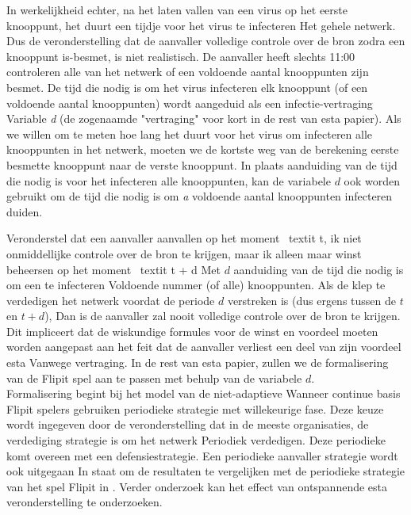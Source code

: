 \documentclass[master=cws, masteroption=vs]{kulemt}
\begin{document}
\begin{abstract*}
In werkelijkheid echter, na het laten vallen van een virus op het eerste knooppunt, het duurt een tijdje voor het virus te infecteren
Het gehele netwerk. Dus de veronderstelling dat de aanvaller volledige controle over de bron zodra een knooppunt is-besmet, is niet realistisch. De aanvaller heeft slechts 11:00 controleren alle van het netwerk of een voldoende aantal knooppunten zijn besmet.
De tijd die nodig is om het virus infecteren elk knooppunt (of een voldoende aantal knooppunten) wordt
aangeduid als een infectie-vertraging Variable \textit{d} (de zogenaamde "vertraging" voor kort in de rest van esta papier). Als we willen om te meten hoe lang het duurt voor het virus om
infecteren alle knooppunten in het netwerk, moeten we de kortste weg van de berekening
eerste besmette knooppunt naar de verste knooppunt. In plaats aanduiding van de tijd die nodig is voor het infecteren alle knooppunten, kan de variabele $ d $ ook worden gebruikt om de tijd die nodig is om \textit{a} voldoende aantal knooppunten infecteren duiden.

Veronderstel dat een aanvaller aanvallen op het moment \ textit {t}, ik niet onmiddellijke controle over de bron te krijgen, maar ik alleen maar winst beheersen op het moment \ textit {t + d} Met $ d $ aanduiding van de tijd die nodig is om een te infecteren Voldoende nummer (of alle) knooppunten. Als de klep te verdedigen het netwerk voordat de periode $ d $ verstreken is (dus ergens tussen de $ t $ en $ t + d $), Dan is de aanvaller zal nooit volledige controle over de bron te krijgen. Dit impliceert dat de wiskundige formules voor de winst en voordeel moeten worden aangepast aan het feit dat de aanvaller verliest een deel van zijn voordeel esta Vanwege vertraging. In de rest van esta papier, zullen we de formalisering van de Flipit spel aan te passen met behulp van de variabele $ d $. \\

Formalisering begint bij het model van de niet-adaptieve Wanneer continue basis Flipit spelers gebruiken periodieke strategie met willekeurige fase. Deze keuze wordt ingegeven door de veronderstelling dat in de meeste organisaties, de verdediging strategie is om het netwerk Periodiek verdedigen. Deze periodieke komt overeen met een defensiestrategie. Een periodieke aanvaller strategie wordt ook uitgegaan In staat om de resultaten te vergelijken met de periodieke strategie van het spel Flipit in \cite{Flipit}. %
Verder onderzoek kan het effect van ontspannende esta veronderstelling te onderzoeken. \\


\end{abstract*}
\end{document}
